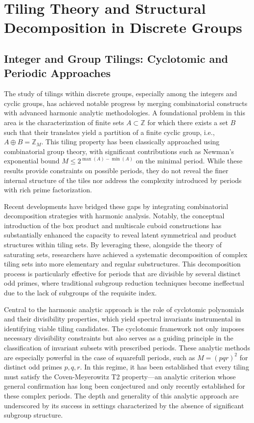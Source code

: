 \documentclass[11pt]{article}
\begin{document}
\section{Tiling Theory and Structural Decomposition in Discrete Groups}
\subsection{Integer and Group Tilings: Cyclotomic and Periodic Approaches}

The study of tilings within discrete groups, especially among the integers and cyclic groups, has achieved notable progress by merging combinatorial constructs with advanced harmonic analytic methodologies. A foundational problem in this area is the characterization of finite sets \( A \subset \mathbb{Z} \) for which there exists a set \( B \) such that their translates yield a partition of a finite cyclic group, i.e., \( A \oplus B = \mathbb{Z}_M \). This tiling property has been classically approached using combinatorial group theory, with significant contributions such as Newman's exponential bound \( M \leq 2^{\max(A)-\min(A)} \) on the minimal period. While these results provide constraints on possible periods, they do not reveal the finer internal structure of the tiles nor address the complexity introduced by periods with rich prime factorization.

Recent developments have bridged these gaps by integrating combinatorial decomposition strategies with harmonic analysis. Notably, the conceptual introduction of the box product and multiscale cuboid constructions has substantially enhanced the capacity to reveal latent symmetrical and product structures within tiling sets. By leveraging these, alongside the theory of saturating sets, researchers have achieved a systematic decomposition of complex tiling sets into more elementary and regular substructures. This decomposition process is particularly effective for periods that are divisible by several distinct odd primes, where traditional subgroup reduction techniques become ineffectual due to the lack of subgroups of the requisite index.

Central to the harmonic analytic approach is the role of cyclotomic polynomials and their divisibility properties, which yield spectral invariants instrumental in identifying viable tiling candidates. The cyclotomic framework not only imposes necessary divisibility constraints but also serves as a guiding principle in the classification of invariant subsets with prescribed periods. These analytic methods are especially powerful in the case of squarefull periods, such as \( M = (pqr)^2 \) for distinct odd primes \( p, q, r \). In this regime, it has been established that every tiling must satisfy the Coven-Meyerowitz T2 property—an analytic criterion whose general confirmation has long been conjectured and only recently established for these complex periods. The depth and generality of this analytic approach are underscored by its success in settings characterized by the absence of significant subgroup structure.
\end{document}
